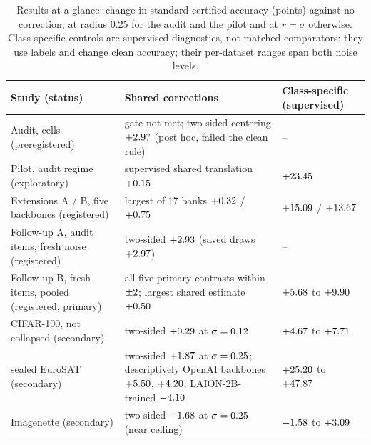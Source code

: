 \begin{table}[t]
\centering
\scriptsize
\setlength{\tabcolsep}{3pt}
\renewcommand{\arraystretch}{1.12}
\caption{Results at a glance: change in standard certified accuracy (points)
against no correction, at radius 0.25 for the audit and the pilot and at
$r=\sigma$ otherwise. Class-specific controls are supervised diagnostics, not
matched comparators: they use labels and change clean accuracy; their
per-dataset ranges span both noise levels.}
\label{tab:glance}
\begin{tabular}{@{}>{\raggedright\arraybackslash}p{}>{\raggedright\arraybackslash}p{}>{\raggedright\arraybackslash}p{}@{}}
\toprule
Study (status) & Shared corrections & Class-specific (supervised) \\
\midrule
Audit, \ExpCells{} cells (preregistered) & gate not met; two-sided centering $+2.97$ (post hoc, failed the clean rule) & -- \\
Pilot, audit regime (exploratory) & supervised shared translation $+0.15$ & $+23.45$ \\
Extensions A / B, five backbones (registered) & largest of 17 banks $+0.32$ / $+0.75$ & $+15.09$ / $+13.67$ \\
Follow-up A, audit items, fresh noise (registered) & two-sided $+2.93$ (saved draws $+2.97$) & -- \\
Follow-up B, fresh items, pooled (registered, primary) & all five primary contrasts within $\pm2$; largest shared estimate $+0.50$ & $+5.68$ to $+9.90$ \\
\quad CIFAR-100, not collapsed (secondary) & two-sided $+0.29$ at $\sigma=0.12$ & $+4.67$ to $+7.71$ \\
\quad sealed EuroSAT (secondary) & two-sided $+1.87$ at $\sigma=0.25$; descriptively OpenAI backbones $+5.50$, $+4.20$, LAION-2B-trained $-4.10$ & $+25.20$ to $+47.87$ \\
\quad Imagenette (secondary) & two-sided $-1.68$ at $\sigma=0.25$ (near ceiling) & $-1.58$ to $+3.09$ \\
\bottomrule
\end{tabular}
\end{table}

